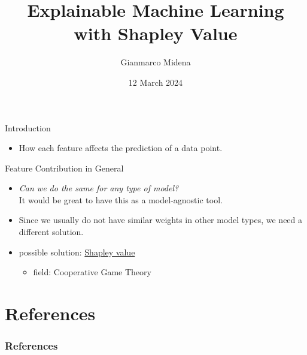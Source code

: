 \documentclass[dvipsnames]{beamer}
\title[XAI with Shapley Value]
{Explainable Machine Learning\\with Shapley Value}
\author{Gianmarco Midena}
\institute{Aalto University}
\date{12 March 2024}
\newcommand{\red}[1]{{\color{red} #1}}
\begin{document}
\begin{frame}
\titlepage
\end{frame}


\begin{frame}{Introduction}
	\begin{itemize}
		\item How each feature affects the prediction of a data point.
	\end{itemize}
\end{frame}



\begin{frame}{Feature Contribution in General}
	\begin{itemize}
		\item \emph{Can we do the same for any type of model?}
		\\It would be great to have this as a model-agnostic tool.
		\item \red{Since we usually do not have similar weights in other model types, we need a different solution.}
		\item possible solution: \underline{Shapley value}
		\begin{itemize}
			\item field: Cooperative Game Theory
		\end{itemize}
	\end{itemize}
\end{frame}



\section{References}
\begin{frame}[allowframebreaks]
\frametitle{References}
\printbibliography
\end{frame}
\end{document}

